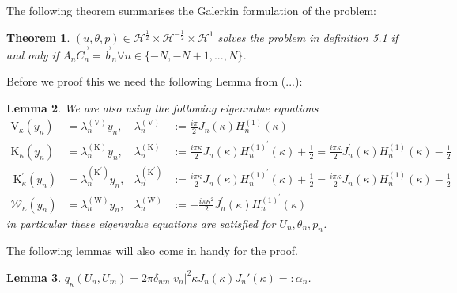 \documentclass[10pt,journal,compsoc, onecolumn]{IEEEtran}
\newtheorem{theorem}{Theorem}[section]
\newtheorem{lemma}[theorem]{Lemma}
\begin{document}
The following theorem summarises the Galerkin formulation of the problem: 
\begin{theorem}
    \((u, \theta, p) \in  \mathcal{H}^{\frac{1}{2}} \times \mathcal{H}^{-\frac{1}{2}} \times \mathcal{H}^{1}\) solves the problem in definition 5.1
    if and only if $A_n\vec{C_n} = \vec{b}_n \forall n \in \{-N, -N + 1, ..., N\}$. 
\end{theorem}

Before we proof this we need the following Lemma from (...): 
\begin{lemma}
    We are also using the following eigenvalue equations 
    $$
    \begin{aligned} 
        \mathrm{V}_{\kappa}\left(y_{n}\right) &=\lambda_{n}^{(\mathrm{V})} y_{n}, & \lambda_{n}^{(\mathrm{V})} &:=\frac{i \pi}{2} J_{n}(\kappa) H_{n}^{(1)}(\kappa) \\ 
        \mathrm{K}_{\kappa}\left(y_{n}\right) &=\lambda_{n}^{(\mathrm{K})} y_{n}, & \lambda_{n}^{(\mathrm{K})} &:=\frac{i \pi \kappa}{2} J_{n}(\kappa) H_{n}^{(1)^{\prime}}(\kappa)+\frac{1}{2}=\frac{i \pi \kappa}{2} J_{n}^{\prime}(\kappa) H_{n}^{(1)}(\kappa)-\frac{1}{2} \\ 
        \mathrm{~K}_{\kappa}^{\prime}\left(y_{n}\right) &=\lambda_{n}^{\left(\mathrm{K}^{\prime}\right)} y_{n}, & \lambda_{n}^{\left(\mathrm{K}^{\prime}\right)} &:=\frac{i \pi \kappa}{2} J_{n}(\kappa) H_{n}^{(1)^{\prime}}(\kappa)+\frac{1}{2}=\frac{i \pi \kappa}{2} J_{n}^{\prime}(\kappa) H_{n}^{(1)}(\kappa)-\frac{1}{2} \\ 
        \mathcal{W}_{\kappa}\left(y_{n}\right) &=\lambda_{n}^{(\mathrm{W})} y_{n}, & \lambda_{n}^{(\mathrm{W})} &:= - \frac{i \pi \kappa^{2}}{2} J_{n}^{\prime}(\kappa) H_{n}^{(1)^{\prime}}(\kappa) 
    \end{aligned}
    $$
    in particular these eigenvalue equations are satisfied for $U_n, \theta_n, p_n$.
\end{lemma}
The following lemmas will also come in handy for the proof.
\begin{lemma}
    $q_\kappa(U_n, U_m) = 2 \pi  \delta_{nm}|v_n|^2\kappa  J_n(\kappa ) J_n'(\kappa ) =: \alpha_n$.
\end{lemma}
\end{document}
